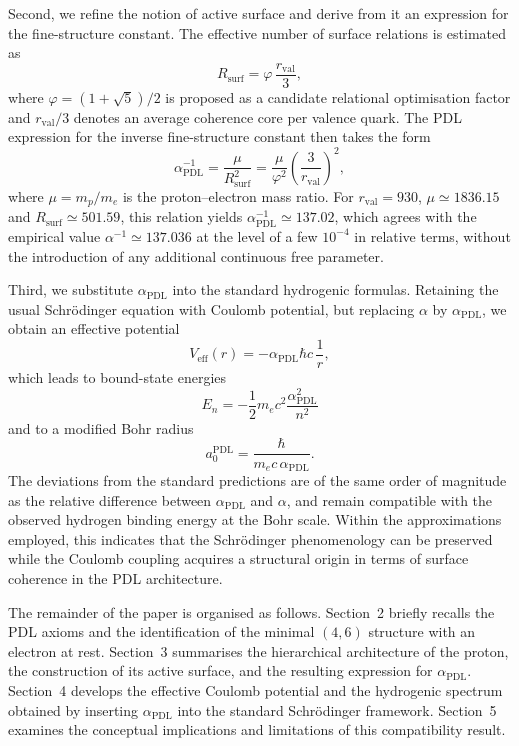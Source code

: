 \documentclass[12pt,a4paper]{article}
\begin{document}
Second, we refine the notion of active surface and derive from it an expression for the fine-structure constant. The effective number of surface relations is estimated as
\[
  R_{\text{surf}} = \varphi\,\frac{r_{\text{val}}}{3},
\]
where \(\varphi = (1+\sqrt{5})/2\) is proposed as a candidate relational optimisation factor and \(r_{\text{val}}/3\) denotes an average coherence core per valence quark. The PDL expression for the inverse fine-structure constant then takes the form
\[
  \alpha_{\text{PDL}}^{-1}
  =
  \frac{\mu}{R_{\text{surf}}^2}
  =
  \frac{\mu}{\varphi^2}\left(\frac{3}{r_{\text{val}}}\right)^2,
\]
where \(\mu = m_p/m_e\) is the proton–electron mass ratio. For \(r_{\text{val}} = 930\), \(\mu \simeq 1836.15\) and \(R_{\text{surf}} \simeq 501.59\), this relation yields \(\alpha_{\text{PDL}}^{-1} \simeq 137.02\), which agrees with the empirical value \(\alpha^{-1} \simeq 137.036\) at the level of a few \(10^{-4}\) in relative terms, without the introduction of any additional continuous free parameter.\cite{Laubscher2026PDL_English,Laubscher2026LDP_French}

Third, we substitute \(\alpha_{\text{PDL}}\) into the standard hydrogenic formulas. Retaining the usual Schr\"odinger equation with Coulomb potential, but replacing \(\alpha\) by \(\alpha_{\text{PDL}}\), we obtain an effective potential
\[
  V_{\text{eff}}(r) = -\alpha_{\text{PDL}}\hbar c\,\frac{1}{r},
\]
which leads to bound-state energies
\[
  E_n = -\frac{1}{2} m_e c^2 \frac{\alpha_{\text{PDL}}^2}{n^2}
\]
and to a modified Bohr radius
\[
  a_0^{\text{PDL}} = \frac{\hbar}{m_e c\,\alpha_{\text{PDL}}}.
\]
The deviations from the standard predictions are of the same order of magnitude as the relative difference between \(\alpha_{\text{PDL}}\) and \(\alpha\), and remain compatible with the observed hydrogen binding energy at the Bohr scale. Within the approximations employed, this indicates that the Schr\"odinger phenomenology can be preserved while the Coulomb coupling acquires a structural origin in terms of surface coherence in the PDL architecture.

The remainder of the paper is organised as follows.
Section~2 briefly recalls the PDL axioms and the identification of the minimal \((4,6)\) structure with an electron at rest. Section~3 summarises the hierarchical architecture of the proton, the construction of its active surface, and the resulting expression for \(\alpha_{\text{PDL}}\). Section~4 develops the effective Coulomb potential and the hydrogenic spectrum obtained by inserting \(\alpha_{\text{PDL}}\) into the standard Schr\"odinger framework. Section~5 examines the conceptual implications and limitations of this compatibility result.
\end{document}
